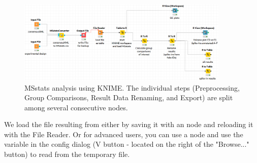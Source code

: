 \begin{figure}[htbp]
	\centering
	\includegraphics[width=0.9\textwidth]{graphics/labelfree/msstats/MSstats.png}
	\caption{MSstats analysis using KNIME. The individual steps (Preprocessing,
	Group Comparisons, Result Data Renaming, and Export) are split among several consecutive nodes.}
	\label{fig:msstats_workflow}
\end{figure}

\noindent We load the file resulting from  either by saving it with an  node and reloading it with the File Reader. Or for advanced users,
you can use a  node and use the variable in the  config dialog (V button - located on the right of the "Browse..." button) to read from the temporary file.


